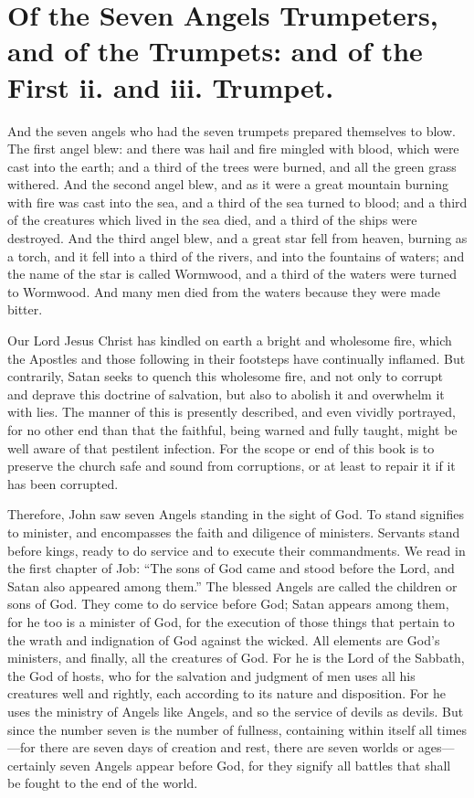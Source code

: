 \chapter[Sermon 38. Of the Seven Angels Trumpeters, and of the Trumpets: and of the First ii. and iii. Trumpet.]{Of the Seven Angels Trumpeters, and of the Trumpets: and of the First ii. and iii. Trumpet.}
\label{sermon:038}

And the seven angels who had the seven trumpets prepared themselves to blow. The first angel blew: and there was hail and fire mingled with blood, which were cast into the earth; and a third of the trees were burned, and all the green grass withered. And the second angel blew, and as it were a great mountain burning with fire was cast into the sea, and a third of the sea turned to blood; and a third of the creatures which lived in the sea died, and a third of the ships were destroyed. And the third angel blew, and a great star fell from heaven, burning as a torch, and it fell into a third of the rivers, and into the fountains of waters; and the name of the star is called Wormwood, and a third of the waters were turned to Wormwood. And many men died from the waters because they were made bitter.

Our Lord Jesus Christ has kindled on earth a bright and wholesome fire, which the Apostles and those following in their footsteps have continually inflamed. But contrarily, Satan seeks to quench this wholesome fire, and not only to corrupt and deprave this doctrine of salvation, but also to abolish it and overwhelm it with lies. The manner of this is presently described, and even vividly portrayed, for no other end than that the faithful, being warned and fully taught, might be well aware of that pestilent infection. For the scope or end of this book is to preserve the church safe and sound from corruptions, or at least to repair it if it has been corrupted.

Therefore, John saw seven Angels standing in the sight of God. To stand signifies to minister, and encompasses the faith and diligence of ministers. Servants stand before kings, ready to do service and to execute their commandments. We read in the first chapter of Job: “The sons of God came and stood before the Lord, and Satan also appeared among them.” The blessed Angels are called the children or sons of God. They come to do service before God; Satan appears among them, for he too is a minister of God, for the execution of those things that pertain to the wrath and indignation of God against the wicked. All elements are God’s ministers, and finally, all the creatures of God. For he is the Lord of the Sabbath, the God of hosts, who for the salvation and judgment of men uses all his creatures well and rightly, each according to its nature and disposition. For he uses the ministry of Angels like Angels, and so the service of devils as devils. But since the number seven is the number of fullness, containing within itself all times—for there are seven days of creation and rest, there are seven worlds or ages—certainly seven Angels appear before God, for they signify all battles that shall be fought to the end of the world.

